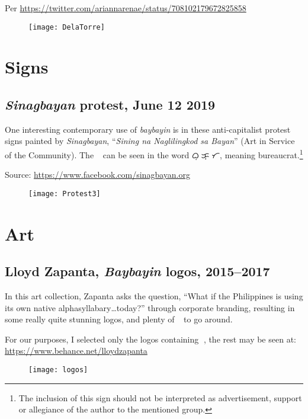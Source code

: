 \documentclass[a4paper,pagesize,openany,14pt,parskip=never]{scrbook}
\newcommand{\≈}{$\approx$}
\newcommand{\ra}{{\baybayin ᜍ}}
\begin{document}
Per \url{https://twitter.com/ariannarenae/status/708102179672825858}

\begin{figure}[H]
\texttt{[image: DelaTorre]}
\end{figure}

\section{Signs}

\subsection{{\em Sinagbayan} protest, June 12 2019}

One interesting contemporary use of {\em baybayin} is in these anti-capitalist protest signs painted by {\em Sinagbayan}, ``{\em Sining na Naglilingkod sa Bayan}'' (Art in Service of the Community). The \ra\ can be seen in the word {\baybayin ᜊᜓᜍᜓᜃ᜔ᜍᜆ}, meaning bureaucrat.\footnote{The inclusion of this sign should not be interpreted as advertisement, support or allegiance of the author to the mentioned group.}

Source: \url{https://www.facebook.com/sinagbayan.org}

\begin{figure}[H]
\texttt{[image: Protest3]}
\end{figure}

\section{Art}

\subsection{Lloyd Zapanta, {\em Baybayin} logos, 2015--2017}

In this art collection, Zapanta asks the question, ``What if the Philippines is using its own native alphasyllabary\ldots today?'' through corporate branding, resulting in some really quite stunning logos, and plenty of \ra\ to go around.

For our purposes, I selected only the logos containing \ra, the rest may be seen at: \url{https://www.behance.net/lloydzapanta}

\begin{figure}[H]
\texttt{[image: logos]}
\end{figure}
\end{document}
